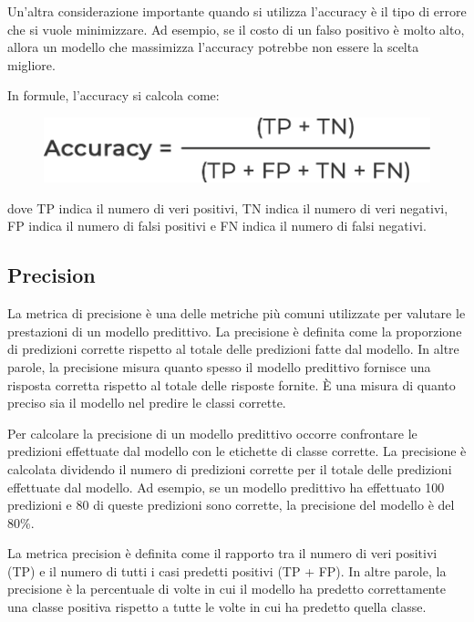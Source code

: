 Un'altra considerazione importante quando si utilizza l'accuracy è il tipo di errore che si vuole minimizzare. Ad esempio, se il costo di un falso positivo è molto alto, allora un modello che massimizza l'accuracy potrebbe non essere la scelta migliore.

In formule, l'accuracy si calcola come:

\begin{figure}
    \begin{center}    
        \includegraphics[width=0.5\linewidth]{images/image47.png}
    \end{center}
\end{figure}

dove TP indica il numero di veri positivi, TN indica il numero di veri negativi, FP indica il numero di falsi positivi e FN indica il numero di falsi negativi.

\subsection{Precision}
La metrica di precisione è una delle metriche più comuni utilizzate per valutare le prestazioni di un modello predittivo. La precisione è definita come la proporzione di predizioni corrette rispetto al totale delle predizioni fatte dal modello. In altre parole, la precisione misura quanto spesso il modello predittivo fornisce una risposta corretta rispetto al totale delle risposte fornite. È una misura di quanto preciso sia il modello nel predire le classi corrette.

Per calcolare la precisione di un modello predittivo occorre confrontare le predizioni effettuate dal modello con le etichette di classe corrette. La precisione è calcolata dividendo il numero di predizioni corrette per il totale delle predizioni effettuate dal modello. Ad esempio, se un modello predittivo ha effettuato 100 predizioni e 80 di queste predizioni sono corrette, la precisione del modello è del 80\%.

La metrica precision è definita come il rapporto tra il numero di veri positivi (TP) e il numero di tutti i casi predetti positivi (TP + FP). In altre parole, la precisione è la percentuale di volte in cui il modello ha predetto correttamente una classe positiva rispetto a tutte le volte in cui ha predetto quella classe.


